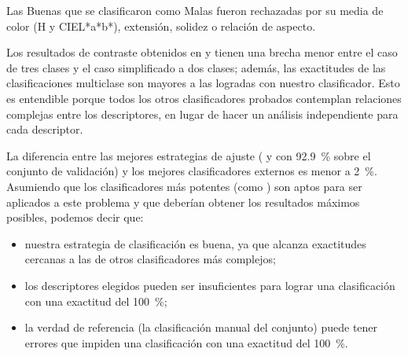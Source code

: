 Las Buenas que se clasificaron como Malas fueron rechazadas por su media de color (H y CIEL*a*b*), extensión, solidez o relación de aspecto.


Los resultados de contraste obtenidos en  y  tienen una brecha menor entre el caso de tres clases y el caso simplificado a dos clases; además, las exactitudes de las clasificaciones multiclase son mayores a las logradas con nuestro clasificador. Esto es entendible porque todos los otros clasificadores probados contemplan relaciones complejas entre los descriptores, en lugar de hacer un análisis independiente para cada descriptor.

La diferencia entre las mejores estrategias de ajuste (\textbf{} y \textbf{} con \SI{92,9}{\percent} sobre el conjunto de validación) y los mejores clasificadores externos es menor a \SI{2}{\percent}. Asumiendo que los clasificadores más potentes (como ) son aptos para ser aplicados a este problema y que deberían obtener los resultados máximos posibles, podemos decir que:
\begin{itemize}
\item nuestra estrategia de clasificación es buena, ya que alcanza exactitudes cercanas a las de otros clasificadores más complejos;
\item los descriptores elegidos pueden ser insuficientes para lograr una clasificación con una exactitud del \SI{100}{\percent};
\item la verdad de referencia (la clasificación manual del conjunto) puede tener errores que impiden una clasificación con una exactitud del \SI{100}{\percent}.
\end{itemize}

